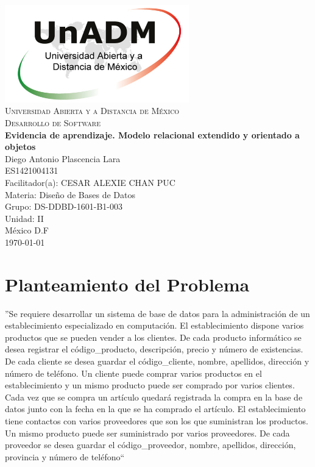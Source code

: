 \documentclass[spanish,12pt,letterpapper]{article}
\begin{document}
	\begin{titlepage}
		\begin{center}
			\includegraphics[width=0.6\textwidth]{../logoUnADM}~\\[1cm] 
			\textsc{Universidad Abierta y a Distancia de México}\\[0.8cm]
			\textsc{Desarrollo de Software}\\[1.8cm]
			
			\textbf{ \Large Evidencia de aprendizaje. Modelo relacional extendido y orientado a objetos }\\[3cm]
			
			Diego Antonio Plascencia Lara\\ ES1421004131 \\[0.4cm]
			Facilitador(a): CESAR ALEXIE CHAN PUC  \\
			Materia: Diseño de Bases de Datos\\
			Grupo: DS-DDBD-1601-B1-003 \\
			Unidad: II \\
			
			\vfill México D.F\\{\today}
			
		\end{center}
	\end{titlepage}
	
	\section{Planteamiento del Problema}	
	''Se requiere desarrollar un sistema de base de datos para la administración de un establecimiento especializado en computación. El establecimiento dispone varios productos que se pueden vender a los clientes. De cada producto informático se desea registrar  el código\_producto, descripción, precio y número de existencias. De cada cliente se desea guardar el código\_cliente, nombre, apellidos, dirección y número de teléfono. Un cliente puede comprar varios productos en el establecimiento y un mismo producto puede ser comprado por varios clientes. Cada vez que se compra un artículo quedará registrada la compra en la base de datos junto con la fecha en la que se ha comprado el artículo. El establecimiento tiene contactos con varios proveedores que son los que suministran los productos. Un mismo producto puede ser suministrado por varios proveedores. De cada proveedor se desea guardar el código\_proveedor, nombre, apellidos, dirección, provincia y número de teléfono``	\\
	
\end{document}
